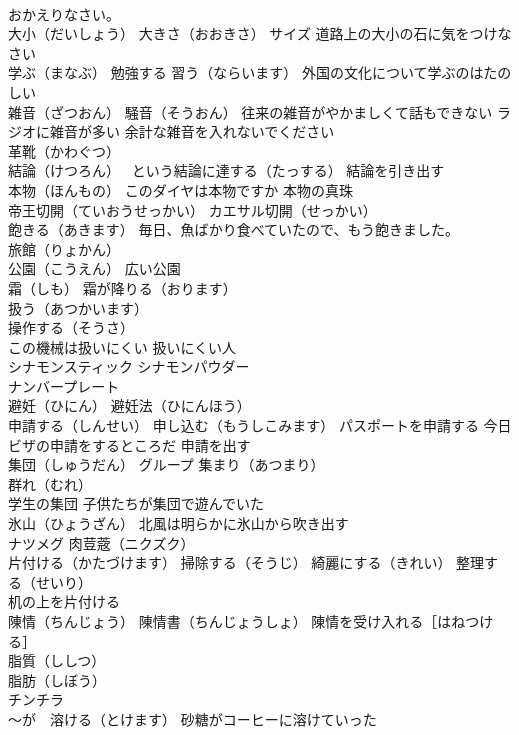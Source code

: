 \documentclass[8pt]{extreport}
\begin{document}
\begin{CJK}{UTF8}{min}
\\	おかえりなさい。
\\	大小（だいしょう） 大きさ（おおきさ） サイズ 道路上の大小の石に気をつけなさい
\\	学ぶ（まなぶ） 勉強する 習う（ならいます） 外国の文化について学ぶのはたのしい
\\	雑音（ざつおん） 騒音（そうおん） 往来の雑音がやかましくて話もできない ラジオに雑音が多い 余計な雑音を入れないでください
\\	革靴（かわぐつ）
\\	結論（けつろん） ~という結論に達する（たっする） 結論を引き出す
\\	本物（ほんもの） このダイヤは本物ですか 本物の真珠
\\	帝王切開（ていおうせっかい） カエサル切開（せっかい）
\\	飽きる（あきます） 毎日、魚ばかり食べていたので、もう飽きました。
\\	旅館（りょかん）
\\	公園（こうえん） 広い公園
\\	霜（しも） 霜が降りる（おります）
\\	扱う（あつかいます） 
\\	操作する（そうさ）
\\	この機械は扱いにくい 扱いにくい人
\\	シナモンスティック シナモンパウダー
\\	ナンバープレート
\\	避妊（ひにん） 避妊法（ひにんほう）
\\	申請する（しんせい） 申し込む（もうしこみます） パスポートを申請する 今日ビザの申請をするところだ 申請を出す
\\	集団（しゅうだん） グループ 集まり（あつまり）
\\	群れ（むれ）
\\	学生の集団 子供たちが集団で遊んでいた
\\	氷山（ひょうざん） 北風は明らかに氷山から吹き出す
\\	ナツメグ 肉荳蔲（ニクズク）
\\	片付ける（かたづけます） 掃除する（そうじ） 綺麗にする（きれい） 整理する（せいり）
\\	机の上を片付ける
\\	陳情（ちんじょう） 陳情書（ちんじょうしょ） 陳情を受け入れる［はねつける］
\\	脂質（ししつ） 
\\	脂肪（しぼう）
\\	チンチラ
\\	～が　溶ける（とけます） 砂糖がコーヒーに溶けていった

\end{CJK}
\end{document}
